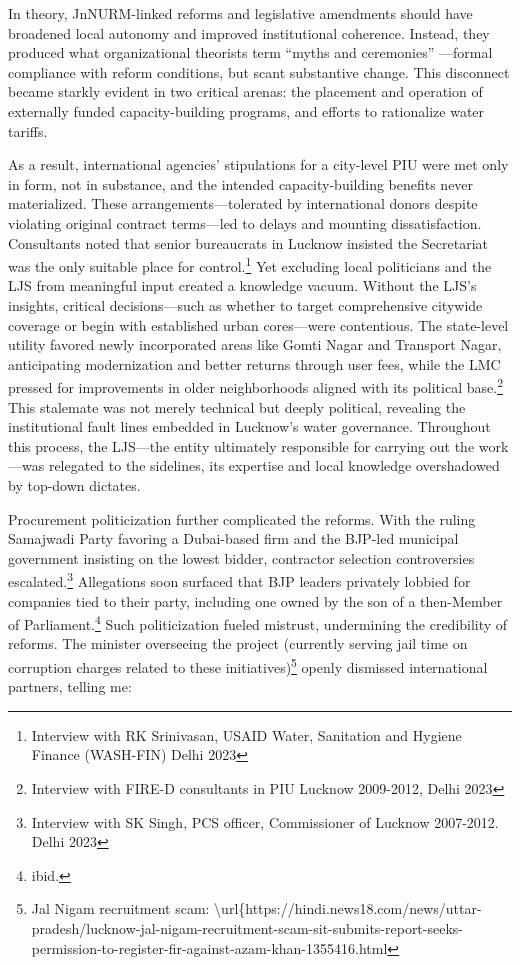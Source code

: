 In theory, JnNURM-linked reforms and legislative amendments should have broadened local autonomy and improved institutional coherence. Instead, they produced what organizational theorists term “myths and ceremonies” \citep{meyer_institutionalized_1977}—formal compliance with reform conditions, but scant substantive change. This disconnect became starkly evident in two critical arenas: the placement and operation of externally funded capacity-building programs, and efforts to rationalize water tariffs.

As a result, international agencies’ stipulations for a city-level PIU were met only in form, not in substance, and the intended capacity-building benefits never materialized. These arrangements—tolerated by international donors despite violating original contract terms—led to delays and mounting dissatisfaction. Consultants noted that senior bureaucrats in Lucknow insisted the Secretariat was the only suitable place for control.\footnote{Interview with RK Srinivasan, USAID Water, Sanitation and Hygiene Finance (WASH-FIN) Delhi 2023} Yet excluding local politicians and the LJS from meaningful input created a knowledge vacuum. Without the LJS’s insights, critical decisions—such as whether to target comprehensive citywide coverage or begin with established urban cores—were contentious. The state-level utility favored newly incorporated areas like Gomti Nagar and Transport Nagar, anticipating modernization and better returns through user fees, while the LMC pressed for improvements in older neighborhoods aligned with its political base.\footnote{Interview with FIRE-D consultants in PIU Lucknow 2009-2012, Delhi 2023} This stalemate was not merely technical but deeply political, revealing the institutional fault lines embedded in Lucknow’s water governance. Throughout this process, the LJS—the entity ultimately responsible for carrying out the work—was relegated to the sidelines, its expertise and local knowledge overshadowed by top-down dictates.

Procurement politicization further complicated the reforms. With the ruling Samajwadi Party favoring a Dubai-based firm and the BJP-led municipal government insisting on the lowest bidder, contractor selection controversies escalated.\footnote{Interview with SK Singh, PCS officer, Commissioner of Lucknow 2007-2012. Delhi 2023} Allegations soon surfaced that BJP leaders privately lobbied for companies tied to their party, including one owned by the son of a then-Member of Parliament.\footnote{ibid.} Such politicization fueled mistrust, undermining the credibility of reforms. The minister overseeing the project (currently serving jail time on corruption charges related to these initiatives)\footnote{Jal Nigam recruitment scam: \textbackslash{}url\{https://hindi.news18.com/news/uttar-pradesh/lucknow-jal-nigam-recruitment-scam-sit-submits-report-seeks-permission-to-register-fir-against-azam-khan-1355416.html} openly dismissed international partners, telling me:

